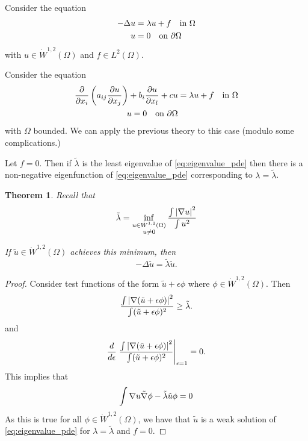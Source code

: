 \documentclass[10pt, oneside, reqno]{amsart}
\theoremstyle{plain}%
\newtheorem{thm}{Theorem}[section]
\numberwithin{equation}{section}
\theoremstyle{definition}
\theoremstyle{remark}
\begin{document}
Consider the equation \begin{align}
    \label{eq:eigenvalue_pde}
    -\Delta u &= \lambda u + f \quad \text{in $\Omega$} \\
    u &= 0 \quad \text{on $\partial \Omega$} \notag \\
\end{align} with $u \in \dot W^{1, 2}(\Omega)$ and $f \in L^2(\Omega)$.

Consider the equation \begin{align*}
    \frac{\partial }{\partial x_i} \left(a_{ij} \frac{\partial u}{\partial x_j} \right) + b_i \frac{\partial u}{\partial x_l} + cu &= \lambda u  + f \quad \text{in $\Omega$} \\
    u = 0 \quad \text{on $\partial \Omega$}
\end{align*} with $\Omega$ bounded.  We can apply the previous theory to this case (modulo some complications.)

Let $f = 0$.  Then if $\tilde \lambda$ is the least eigenvalue of \eqref{eq:eigenvalue_pde} then there is a non-negative eigenfunction of \eqref{eq:eigenvalue_pde} corresponding to $\lambda = \tilde \lambda$.

\begin{thm}
    \label{lem:minimal_eigenvalues}
    Recall that \begin{equation}
        \tilde \lambda = \inf_{\substack{u \in \dot W^{1,2}(\Omega) \\ u \neq 0}} \frac{\int \left| \nabla u \right|^2}{\int u^2} 
        \label{eq:minimal_eigenvalue}
    \end{equation}
    
    
    If $\tilde u \in \dot W^{1, 2}(\Omega)$ achieves this minimum, then \[
        -\Delta \tilde u = \tilde \lambda \tilde u.
    \]
\end{thm}

\begin{proof}
    Consider test functions of the form $\tilde u + \epsilon \phi$ where $\phi \in \dot W^{1, 2}(\Omega)$. Then \[
        \frac{\int \left| \nabla(\tilde u + \epsilon \phi) \right|^2}{\int (\tilde u + \epsilon \phi)^2} \geq \tilde \lambda.
    \]  and \[
        \frac{d}{d\epsilon} \left.\frac{\int \left| \nabla(\tilde u + \epsilon \phi) \right|^2}{\int (\tilde u + \epsilon \phi)^2} \right|_{\epsilon = 1} = 0.
    \]  This implies that \[
        \int \nabla u \tilde {\nabla} \phi - \tilde \lambda \tilde u \phi = 0
    \]  As this is true for all $\phi \in \dot W^{1, 2}(\Omega)$, we have that $\tilde u$ is a weak solution of \eqref{eq:eigenvalue_pde} for $\lambda = \tilde \lambda$ and $f = 0$.
\end{proof}
\end{document}
